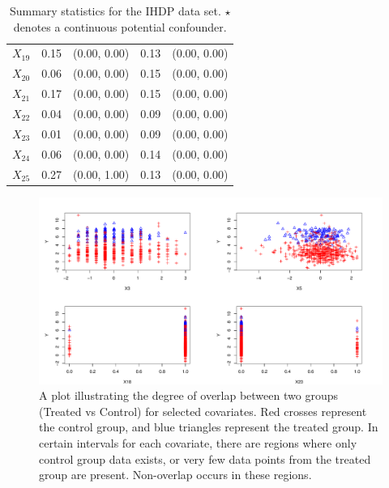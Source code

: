 \begin{table}[ht]
\begin{tabular}{l|cc|cc}
  $X_{19}$ & 0.15 & (0.00, 0.00) & 0.13 & (0.00, 0.00) \\
  $X_{20}$ & 0.06 & (0.00, 0.00) & 0.15 & (0.00, 0.00) \\
  $X_{21}$ & 0.17 & (0.00, 0.00) & 0.15 & (0.00, 0.00) \\
  $X_{22}$ & 0.04 & (0.00, 0.00) & 0.09 & (0.00, 0.00) \\
  $X_{23}$ & 0.01 & (0.00, 0.00) & 0.09 & (0.00, 0.00) \\
  $X_{24}$ & 0.06 & (0.00, 0.00) & 0.14 & (0.00, 0.00) \\
  $X_{25}$ & 0.27 & (0.00, 1.00) & 0.13 & (0.00, 0.00) \\
   \hline
\end{tabular}
\caption{Summary statistics for the IHDP data set. $\star$ denotes a continuous potential confounder.}
\label{tab:iphd}
\end{table}

\begin{figure}[htbp]
\includegraphics[width=\linewidth]{fig/overlap.pdf}
\caption{A plot illustrating the degree of overlap between two groups (Treated vs Control) for selected covariates. Red crosses represent the control group, and blue triangles represent the treated group. In certain intervals for each covariate, there are regions where only control group data exists, or very few data points from the treated group are present. Non-overlap occurs in these regions.}\label{fig:ioverlap}
\end{figure}



